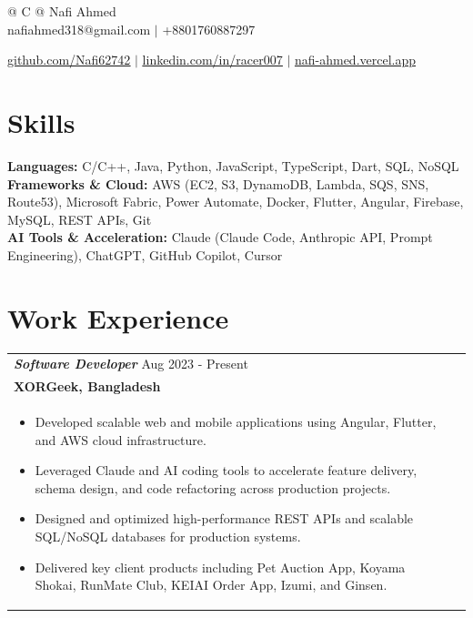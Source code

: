 \documentclass[a4paper,8pt]{article}
\begin{document}
\pagestyle{empty}

\begin{tabularx}{\linewidth}{@{} C @{}}
\color[HTML]{1C033C} \Huge{Nafi Ahmed} \\[4pt]
\textcolor[HTML]{371e77}{{{{\faEnvelope} nafiahmed318@gmail.com}} $|$}
\textcolor[HTML]{371e77}{{{\faMobile} +8801760887297}}

\textcolor[HTML]{371e77}{\underline{{\raisebox{-0.05\height}{\faGithub} \href{https://github.com/Nafi62742}{github.com/Nafi62742}}} $|$}
\textcolor[HTML]{371e77}{\underline{{\raisebox{-0.05\height}{\faLinkedin} \href{https://linkedin.com/in/racer007}{linkedin.com/in/racer007}}} $|$}
\textcolor[HTML]{371e77}{\underline{{\raisebox{-0.05\height}{\faGlobe} \href{https://nafi-ahmed.vercel.app}{nafi-ahmed.vercel.app}}}}
\end{tabularx}

\vfill
\section{Skills}
\color[HTML]{1C033C}\textbf{Languages:} C/C++, Java, Python, JavaScript, TypeScript, Dart, SQL, NoSQL\\[2pt]
\color[HTML]{1C033C}\textbf{Frameworks \& Cloud:} AWS (EC2, S3, DynamoDB, Lambda, SQS, SNS, Route53), Microsoft Fabric, Power Automate, Docker, Flutter, Angular, Firebase, MySQL, REST APIs, Git\\[2pt]
\color[HTML]{1C033C}\textbf{AI Tools \& Acceleration:} Claude (Claude Code, Anthropic API, Prompt Engineering), ChatGPT, GitHub Copilot, Cursor\\[2pt]

\vfill
\section{Work Experience}

\begin{tabularx}{\linewidth}{ @{}l r@{} }
\color[HTML]{371e77}\textbf{\textit{Software Developer}} \hfill \color[HTML]{371e77} Aug 2023 - Present \\[2pt]
\textbf{{XORGeek, Bangladesh}} \hfill \\[2.5pt]
\begin{minipage}[t]{\linewidth}
\begin{itemize}[nosep,after=\strut, leftmargin=1.5em, itemsep=2pt]
\item Developed scalable web and mobile applications using Angular, Flutter, and AWS cloud infrastructure.
\item Leveraged Claude and AI coding tools to accelerate feature delivery, schema design, and code refactoring across production projects.
\item Designed and optimized high-performance REST APIs and scalable SQL/NoSQL databases for production systems.
\item Delivered key client products including Pet Auction App, Koyama Shokai, RunMate Club, KEIAI Order App, Izumi, and Ginsen.
\end{itemize}
\end{minipage}
\end{tabularx}
\end{document}
